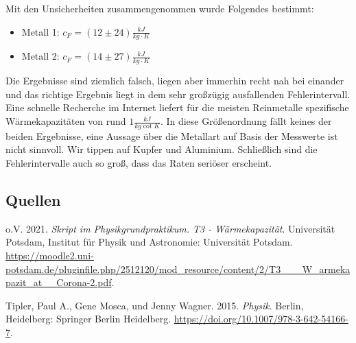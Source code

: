 \documentclass[
  9pt,
]{article}
\newlength{\cslhangindent}
\newlength{\cslentryspacingunit} %
\newenvironment{CSLReferences}[2] %
 {%
  \setlength{\parindent}{0pt}
  \ifodd #1
  \let\oldpar\par
  \def\par{\hangindent=\cslhangindent\oldpar}
  \fi
  \setlength{\parskip}{#2\cslentryspacingunit}
 }%
 {}
\begin{document}
Mit den Unsicherheiten zusammengenommen wurde Folgendes bestimmt:

\begin{itemize}
  \item Metall 1: $c_F = (12\pm 24)\frac{kJ}{kg\cdot K}$
  \item Metall 2: $c_F = (14\pm 27)\frac{kJ}{kg\cdot K}$
\end{itemize}

Die Ergebnisse sind ziemlich falsch, liegen aber immerhin recht nah bei
einander und das richtige Ergebnis liegt in dem sehr großzügig
ausfallenden Fehlerintervall. Eine schnelle Recherche im Internet
liefert für die meisten Reinmetalle spezifische Wärmekapazitäten von
rund \(1\frac{kJ}{kg\cot K}\). In diese Größenordnung fällt keines der
beiden Ergebnisse, eine Aussage über die Metallart auf Basis der
Messwerte ist nicht sinnvoll. Wir tippen auf Kupfer und Aluminium.
Schließlich sind die Fehlerintervalle auch so groß, dass das Raten
seriöser erscheint.

\hypertarget{quellen}{%
\subsection*{Quellen}\label{quellen}}

\hypertarget{refs}{}
\begin{CSLReferences}{1}{0}
\leavevmode{}%
o.V. 2021. \emph{Skript im Physikgrundpraktikum. T3 - Wärmekapazität}.
Universität Potsdam, Institut für Physik und Astronomie: {Universität
Potsdam}.
\url{https://moodle2.uni-potsdam.de/pluginfile.php/2512120/mod_resource/content/2/T3___W_armekapazit_at__Corona-2.pdf}.

\leavevmode{}%
Tipler, Paul A., Gene Mosca, und Jenny Wagner. 2015. \emph{Physik}.
Berlin, Heidelberg: {Springer Berlin Heidelberg}.
\url{https://doi.org/10.1007/978-3-642-54166-7}.

\end{CSLReferences}
\end{document}
